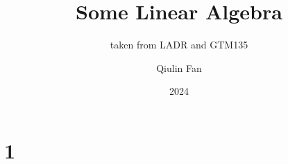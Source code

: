 \documentclass[lang=cn,11pt]{elegantbook}
\title{Some Linear Algebra}
\subtitle{taken from LADR and GTM135}
\author{Qiulin Fan}
\date{2024}
\begin{document}
\maketitle
\frontmatter
\tableofcontents

\mainmatter

\chapter{1}
\end{document}
